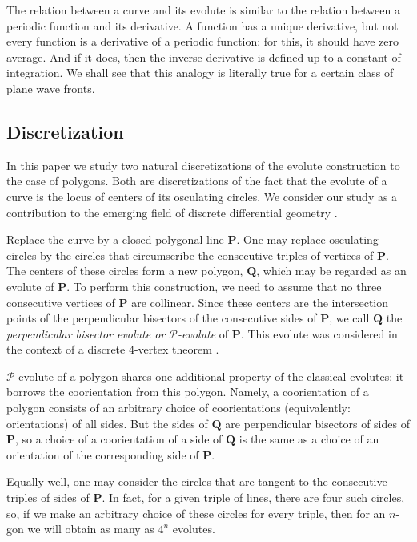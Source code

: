 \documentclass[12pt]{article}
\newcommand{\Pev}{\mathcal{P}}
\renewcommand{\P}{\mathbf{P}}
\begin{document}
 The relation between a curve and its evolute is similar to the relation between a periodic function and its derivative. A function has a unique derivative, but not every function is a derivative of a periodic function: for this, it should have zero average. And if it does, then the inverse derivative is defined up to a constant of integration. We shall see that this analogy is literally true for a certain class of plane wave fronts.

 
\subsection{Discretization}\label{discretization}
In this paper we  study two natural discretizations of the evolute construction to the case of polygons. Both are discretizations of the fact that the evolute of a curve is the locus of centers of its osculating circles. We consider our study as a contribution to the emerging field of discrete differential geometry \cite{BS,Ho}.

Replace the curve by a closed polygonal line $\P$. One may replace osculating circles by the circles that circumscribe the consecutive triples of vertices of $\P$. The centers of these circles form a new polygon, $\mathbf{Q}$, which may be regarded as an evolute of $\P$. To perform this construction, we need to assume that no three consecutive vertices of $\P$ are collinear. Since these centers are the intersection points of the perpendicular bisectors of the consecutive sides of $\P$, we call $\mathbf{Q}$ the  {\it perpendicular bisector evolute or $\Pev$-evolute} of $\P$. This  evolute was considered in the context of a discrete 4-vertex theorem \cite{Mo,Mu}. 

$\Pev$-evolute of a polygon shares one additional property of the classical evolutes: it borrows the coorientation from this polygon. Namely, a coorientation of a polygon consists of an arbitrary choice of coorientations (equivalently: orientations) of all sides. But the sides of $\mathbf Q$ are  perpendicular bisectors of sides of $\P$, so a choice of a coorientation of a side of $\mathbf Q$ is the same as a choice of an orientation of the corresponding side of $\P$.

Equally well, one may consider the circles that are tangent to the  consecutive triples of sides of $\P$.  In fact, for a given triple of lines, there are four such circles, so, if we make an arbitrary choice of these circles for every triple, then for an $n$-gon we will obtain as many as $4^n$ evolutes. 
\end{document}

